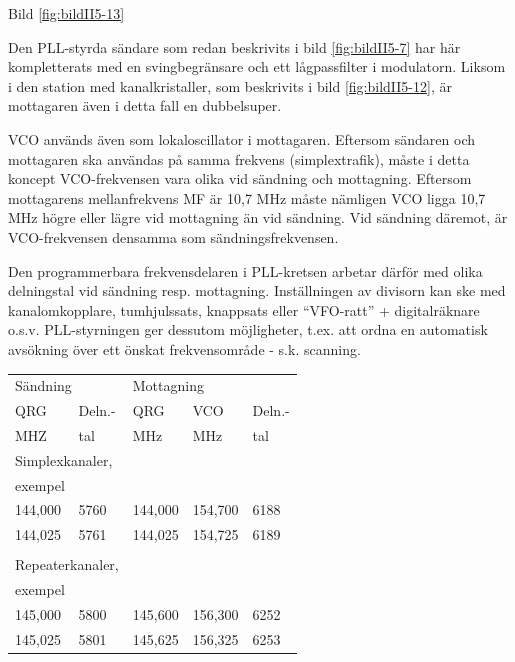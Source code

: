 Bild \ref{fig:bildII5-13}

Den PLL-styrda sändare som redan beskrivits i bild \ref{fig:bildII5-7} har här
kompletterats med en svingbegränsare och ett lågpassfilter i
modulatorn. Liksom i den station med kanalkristaller, som beskrivits i
bild \ref{fig:bildII5-12}, är mottagaren även i detta fall en dubbelsuper.

VCO används även som lokaloscillator i mottagaren. Eftersom sändaren
och mottagaren ska användas på samma frekvens (simplextrafik), måste
i detta koncept VCO-frekvensen vara olika vid sändning och
mottagning. Eftersom mottagarens mellanfrekvens MF är 10,7 MHz måste
nämligen VCO ligga 10,7 MHz högre eller lägre vid mottagning än vid
sändning. Vid sändning däremot, är VCO-frekvensen densamma som
sändningsfrekvensen.

Den programmerbara frekvensdelaren i PLL-kretsen arbetar därför med
olika delningstal vid sändning resp. mottagning. Inställningen av
divisorn kan ske med kanalomkopplare, tumhjulssats, knappsats eller
``VFO-ratt'' + digitalräknare o.s.v. PLL-styrningen ger dessutom
möjligheter, t.ex. att ordna en automatisk avsökning över ett önskat
frekvensområde - s.k. scanning.

\begin{table}[h]
  \begin{tabular}{ll|lll}
    \multicolumn{2}{l|}{Sändning} &
    \multicolumn{3}{l}{Mottagning} \\
    QRG & Deln.- & QRG & VCO & Deln.- \\
    MHZ & tal    & MHz & MHz & tal \\
    \hline
    \multicolumn{2}{l|}{Simplexkanaler,} & & & \\
    \multicolumn{2}{l|}{exempel} & & & \\
    144,000 & 5760 & 144,000 & 154,700 & 6188 \\
    144,025 & 5761 & 144,025 & 154,725 & 6189 \\
    & & & & \\
    \multicolumn{2}{l|}{Repeaterkanaler,} & & & \\
    \multicolumn{2}{l|}{exempel} & & & \\
    145,000 & 5800 & 145,600 & 156,300 & 6252 \\
    145,025 & 5801 & 145,625 & 156,325 & 6253 \\
  \end{tabular}
\end{table}


